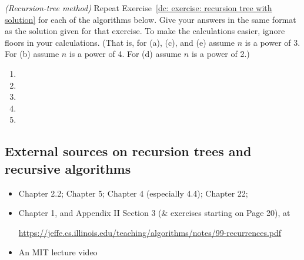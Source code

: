 \exercise\label{dc: exercise: recursion}\emph{(Recursion-tree method)}
Repeat Exercise~\ref{dc: exercise: recursion tree with solution} for each of the algorithms below.
Give your answers in the same format as the solution given for that exercise.
To make the calculations easier, ignore floors in your calculations.
(That is, for (a), (c), and (e) assume $n$ is a power of 3.
For (b) assume $n$ is a power of 4. 
For (d) assume $n$ is a power of 2.)

\begin{enumerate}[label=(\alph*)]
\item {}
  
\item {}

\item {}

\item {}

\item {}

\end{enumerate}


\subsection{External sources on recursion trees and recursive algorithms}\label{dc: sec: refs}

\begin{itemize}

\item \DPV Chapter 2.2; \KT Chapter 5; \CLRS Chapter 4 (especially 4.4); \LLM Chapter 22;

\item \JE Chapter 1, and Appendix II Section 3 (\& exercises starting on Page 20), at
  
  {\small \url{https://jeffe.cs.illinois.edu/teaching/algorithms/notes/99-recurrences.pdf}}

\item An MIT lecture video
  


\end{itemize}

